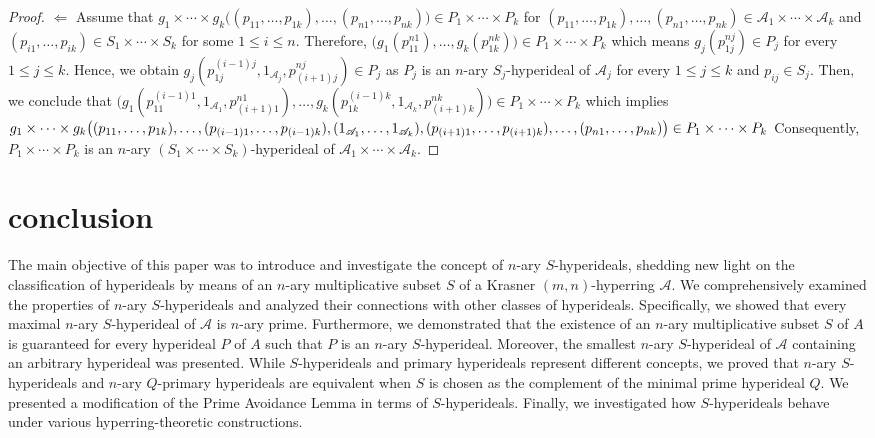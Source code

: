 \documentclass[preprint,review,10pt]{amsart}
\theoremstyle{definition}
\theoremstyle{remark}
\numberwithin{equation}{section}
\begin{document}
\begin{proof}
$\Longleftarrow$ Assume that $g_1 \times \cdots \times g_k \big((p_{11},\ldots,p_{1k}),\ldots,(p_{n1},\ldots,p_{nk} )\big) \in P_1 \times \cdots \times P_k$ for $(p_{11},\ldots,p_{1k}),\ldots,(p_{n1},\ldots,p_{nk} ) \in \mathscr{A}_1 \times \cdots \times \mathscr{A}_k$ and $(p_{i1},\ldots,p_{ik} ) \in S_1 \times \cdots \times S_k$ for some $1 \leq i \leq n$. Therefore,  $\big(g_1(p_{11}^{n1}),\ldots,g_k(p_{1k}^{nk})\big) \in P_1 \times \cdots \times P_k$ which means $g_j(p_{1j}^{nj}) \in P_j$ for every $1 \leq j \leq k$. Hence, we obtain $g_j(p_{1j}^{{(i-1)}j},1_{\mathscr{A}_j}, p_{(i+1)j}^{nj}) \in P_j$ as $P_j$ is an $n$-ary $S_j$-hyperideal of $\mathscr{A}_j$ for every $1 \leq j \leq k$ and $p_{ij} \in S_j$. Then, we conclude that $\big( g_1(p_{11}^{{(i-1)}1},1_{\mathscr{A}_1}, p_{(i+1)1}^{n1}),\ldots,g_k(p_{1k}^{{(i-1)}k},1_{\mathscr{A}_k}, p_{(i+1)k}^{nk})   \big) \in P_1 \times \cdots \times P_k$ which implies $g_1 \times \cdots \times g_k \big((p_{11},\ldots,p_{1k}),\ldots,(p_{{(i-1)}1},\ldots,p_{(i-1)k}),(1_{\mathscr{A}_1},\ldots,1_{\mathscr{A}_k}),\break(p_{{(i+1)}1},\ldots,p_{(i+1)k}),\ldots,(p_{n1},\ldots,p_{nk} )\big) \in P_1 \times \cdots \times P_k$ Consequently, $P_1 \times \cdots \times P_k$ is an $n$-ary $(S_1 \times \cdots \times S_k)$-hyperideal of $\mathscr{A}_1 \times \cdots \times \mathscr{A}_k$.
\end{proof}



\section{conclusion}
The main objective of this paper was to introduce  and investigate  the concept of $n$-ary $S$-hyperideals, shedding new light on the classification of hyperideals  by means of  an $n$-ary multiplicative subset $S$ of a Krasner $(m,n)$-hyperring $\mathscr{A}$.
We comprehensively examined the properties of $n$-ary $S$-hyperideals and analyzed their connections with other classes of hyperideals. Specifically, we showed that every maximal $n$-ary $S$-hyperideal of $\mathscr{A}$ is $n$-ary prime. Furthermore, we demonstrated that the existence of an $n$-ary multiplicative subset $S$ of $A$ is guaranteed for every hyperideal $P$ of $A$ such that $P$ is an $n$-ary $S$-hyperideal. Moreover, the smallest $n$-ary $S$-hyperideal of $\mathscr{A}$ containing an arbitrary hyperideal was presented. While $S$-hyperideals and primary hyperideals represent different concepts, we proved that  $n$-ary $S$-hyperideals and $n$-ary $Q$-primary hyperideals are equivalent when $S$ is chosen as the complement of the minimal prime hyperideal $Q$. We presented  a modification of the Prime Avoidance Lemma in terms of $S$-hyperideals. Finally, we  investigated how $S$-hyperideals behave under various hyperring-theoretic constructions.
\end{document}
